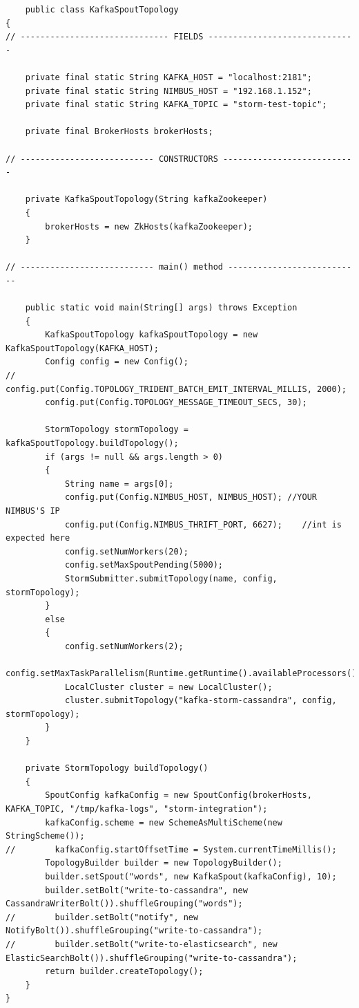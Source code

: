 \documentclass{hcmutarticle}
\begin{document}
\begin{lstlisting}
	public class KafkaSpoutTopology
{
// ------------------------------ FIELDS ------------------------------

    private final static String KAFKA_HOST = "localhost:2181";
    private final static String NIMBUS_HOST = "192.168.1.152";
    private final static String KAFKA_TOPIC = "storm-test-topic";

    private final BrokerHosts brokerHosts;

// --------------------------- CONSTRUCTORS ---------------------------

    private KafkaSpoutTopology(String kafkaZookeeper)
    {
        brokerHosts = new ZkHosts(kafkaZookeeper);
    }

// --------------------------- main() method ---------------------------

    public static void main(String[] args) throws Exception
    {
        KafkaSpoutTopology kafkaSpoutTopology = new KafkaSpoutTopology(KAFKA_HOST);
        Config config = new Config();
//        config.put(Config.TOPOLOGY_TRIDENT_BATCH_EMIT_INTERVAL_MILLIS, 2000);
        config.put(Config.TOPOLOGY_MESSAGE_TIMEOUT_SECS, 30);

        StormTopology stormTopology = kafkaSpoutTopology.buildTopology();
        if (args != null && args.length > 0)
        {
            String name = args[0];
            config.put(Config.NIMBUS_HOST, NIMBUS_HOST); //YOUR NIMBUS'S IP
            config.put(Config.NIMBUS_THRIFT_PORT, 6627);    //int is expected here
            config.setNumWorkers(20);
            config.setMaxSpoutPending(5000);
            StormSubmitter.submitTopology(name, config, stormTopology);
        }
        else
        {
            config.setNumWorkers(2);
            config.setMaxTaskParallelism(Runtime.getRuntime().availableProcessors());
            LocalCluster cluster = new LocalCluster();
            cluster.submitTopology("kafka-storm-cassandra", config, stormTopology);
        }
    }

    private StormTopology buildTopology()
    {
        SpoutConfig kafkaConfig = new SpoutConfig(brokerHosts, KAFKA_TOPIC, "/tmp/kafka-logs", "storm-integration");
        kafkaConfig.scheme = new SchemeAsMultiScheme(new StringScheme());
//        kafkaConfig.startOffsetTime = System.currentTimeMillis();
        TopologyBuilder builder = new TopologyBuilder();
        builder.setSpout("words", new KafkaSpout(kafkaConfig), 10);
        builder.setBolt("write-to-cassandra", new CassandraWriterBolt()).shuffleGrouping("words");
//        builder.setBolt("notify", new NotifyBolt()).shuffleGrouping("write-to-cassandra");
//        builder.setBolt("write-to-elasticsearch", new ElasticSearchBolt()).shuffleGrouping("write-to-cassandra");
        return builder.createTopology();
    }
}
\end{lstlisting}
\end{document}
